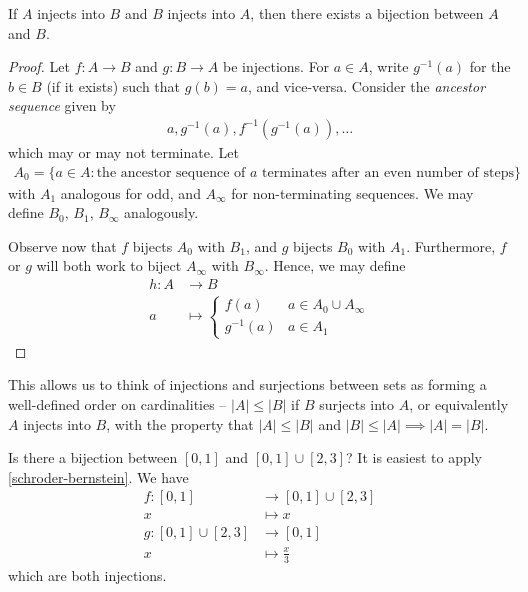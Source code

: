 \documentclass{../../template/note}
\begin{document}
    \begin{theorem}
        \label{schroder-bernstein}
        If \(A\) injects into \(B\) and \(B\) injects into \(A\), then there exists a bijection between \(A\) and \(B\).
    \end{theorem}
    
    \begin{proof}
        Let \(f: A \to B\) and \(g: B \to A\) be injections. For \(a \in A\), write \(g^{-1}(a)\) for the \(b \in B\) (if it exists) such that \(g(b) = a\), and vice-versa. Consider the \emph{ancestor sequence} given by
        \begin{align*}
            a, g^{-1}(a), f^{-1}(g^{-1}(a)), \dots
        \end{align*}
        which may or may not terminate. Let 
        \begin{align*}
            A_0 = \{a \in A: \text{the ancestor sequence of \(a\) terminates after an even number of steps}\}
        \end{align*}
        with \(A_1\) analogous for odd, and \(A_\infty\) for non-terminating sequences. We may define \(B_0\), \(B_1\), \(B_\infty\) analogously.

        Observe now that \(f\) bijects \(A_0\) with \(B_1\), and \(g\) bijects \(B_0\) with \(A_1\). Furthermore, \(f\) or \(g\) will both work to biject \(A_\infty\) with \(B_\infty\). Hence, we may define
        \begin{align*}
            h: A &\to B \\
            a &\mapsto \begin{cases}
                f(a) & a \in A_0 \cup A_\infty \\
                g^{-1}(a) & a \in A_1
            \end{cases}
        \end{align*}
    \end{proof}
    
    This allows us to think of injections and surjections between sets as forming a well-defined order on cardinalities -- \(|A| \leq |B|\) if \(B\) surjects into \(A\), or equivalently \(A\) injects into \(B\), with the property that \(|A| \leq |B|\) and \(|B| \leq |A| \implies |A| = |B|\).
    
    \begin{example*}
        Is there a bijection between \([0, 1]\) and \([0, 1] \cup [2, 3]\)? It is easiest to apply \cref{schroder-bernstein}. We have
        \begin{align*}
            f: [0, 1] &\to [0, 1] \cup [2, 3] \\
            x &\mapsto x \\[10pt]
            g: [0, 1] \cup [2, 3] &\to [0, 1] \\
            x &\mapsto \frac x 3 
        \end{align*}
        which are both injections.        
    \end{example*}
    
\end{document}
